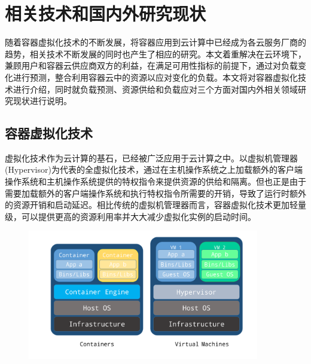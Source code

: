 
\chapter{相关技术和国内外研究现状}
\label{chap:art_of_state}
随着容器虚拟化技术的不断发展，将容器应用到云计算中已经成为各云服务厂商的趋势，相关技术不断发展的同时也产生了相应的研究。本文着重解决在云环境下，兼顾用户和容器云供应商双方的利益，在满足可用性指标的前提下，通过对负载变化进行预测，整合利用容器云中的资源以应对变化的负载。本文将对容器虚拟化技术进行介绍，同时就负载预测、资源供给和负载应对三个方面对国内外相关领域研究现状进行说明。

\section{容器虚拟化技术}
虚拟化技术作为云计算的基石，已经被广泛应用于云计算之中\cite{zhang2010cloud}。以虚拟机管理器(Hypervisor)为代表的全虚拟化技术，通过在主机操作系统之上加载额外的客户端操作系统和主机操作系统提供的特权指令来提供资源的供给和隔离。但也正是由于需要加载额外的客户端操作系统和执行特权指令所需要的开销，导致了运行时额外的资源开销和启动延迟\cite{bernstein2014containers}。相比传统的虚拟机管理器而言，容器虚拟化技术更加轻量级，可以提供更高的资源利用率并大大减少虚拟化实例的启动时间\cite{soltesz2007container}。

\begin{figure}[h]
\centering
\includegraphics[width=0.9\textwidth]{./figure/container-vm}
\end{figure}

